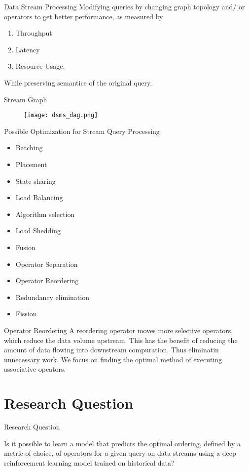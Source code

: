 \begin{frame}{Data Stream Processing}
    Modifying queries by changing graph topology and/ or operators to get better performance, as measured by
    \begin{enumerate}
        \item Throughput
        \item Latency
        \item Resource Usage.
    \end{enumerate}
    While preserving semantice of the original query.
\end{frame}

\begin{frame}{Stream Graph}
    \begin{figure}
        \centering
        \texttt{[image: dsms\_dag.png]}
        \label{fig:j_1}
    \end{figure}
\end{frame}

\begin{frame}{Possible Optimization for Stream Query Processing}
    \begin{itemize}
        \item Batching
        \item Placement
        \item State sharing
        \item Load Balancing
        \item Algorithm selection
        \item Load Shedding
        \item Fusion
        \item Operator Separation
        \item Operator Reordering
        \item Redundancy elimination
        \item Fission
    \end{itemize}
\end{frame}

\begin{frame}{Operator Reordering}
    A reordering operator moves more selective operators, which reduce the data volume upstream. This has the benefit of reducing the amount of data flowing into downstream compuration. Thus eliminatin unnecessary work. 
    We focus on finding the optimal method of executing associative opeators.
\end{frame}

\section{Research Question}
\frame{\sectionpage}

\begin{frame}{Research Question}
    \begin{center}
    Is it possible to learn a model that predicts the optimal ordering, defined by a metric of choice, of operators for a given query on data streams using a deep reinforcement learning model trained on historical data?
    \end{center}
    
\end{frame}


